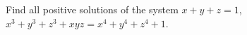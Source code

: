 Find all positive solutions of the system $x + y + z = 1$, $x^3 + y^3 + z^3 + xyz = x^4 + y^4 + z^4 + 1$.
